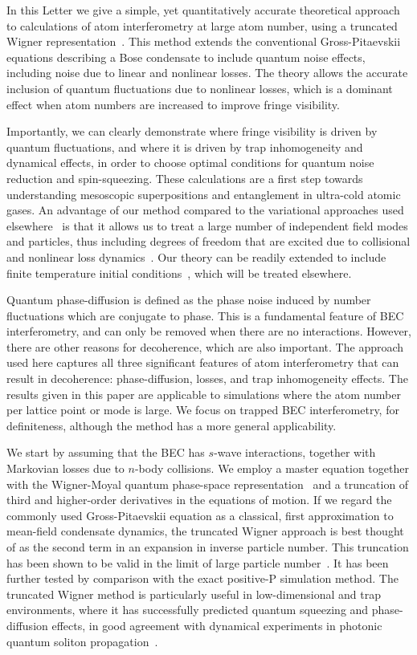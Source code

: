 \documentclass[aps,prl,twocolumn,showpacs,amsmath,amssymb,superscriptaddress,flushbottom,noraggedfooter]{revtex4-1}
\begin{document}
In this Letter we give a simple, yet quantitatively accurate theoretical approach
to calculations of atom interferometry at large atom number,
using a truncated Wigner representation~\cite{Drummond1993,Steel1998,Sinatra2002}.
This method extends the conventional Gross-Pitaevskii equations
describing a Bose condensate to include quantum noise effects,
including noise due to linear and nonlinear losses.
The theory allows the accurate inclusion of quantum fluctuations due to nonlinear losses,
which is a dominant effect when atom numbers are increased to improve fringe visibility.

Importantly, we can clearly demonstrate where fringe visibility is driven by quantum fluctuations,
and where it is driven by trap inhomogeneity and dynamical effects,
in order to choose optimal conditions for quantum noise reduction and spin-squeezing.
These calculations are a first step towards understanding mesoscopic superpositions and entanglement in ultra-cold atomic gases.
An advantage of our method compared to the variational approaches used elsewhere~\cite{Li2009,Sakmann2009}
is that it allows us to treat a large number of independent field modes and particles,
thus including degrees of freedom that are excited due to
collisional and nonlinear loss dynamics~\cite{Norrie2005,Deuar2007}.
Our theory can be readily extended to include finite temperature initial conditions~\cite{Steel1998,Isella2006},
which will be treated elsewhere.

Quantum phase-diffusion is defined as the phase noise induced by number fluctuations
which are conjugate to phase.
This is a fundamental feature of BEC interferometry, and can only be removed when there are no interactions.
However, there are other reasons for decoherence, which are also important.
The approach used here captures all three significant features of atom
interferometry that can result in decoherence: phase-diffusion, losses,
and trap inhomogeneity effects.
The results given in this paper are applicable to simulations where the
atom number per lattice point or mode is large.
We focus on trapped BEC interferometry, for definiteness, although the method has a more general applicability.

We start by assuming that the BEC has $s$-wave interactions,
together with Markovian losses due to $n$-body collisions.
We employ a master equation together with the Wigner-Moyal quantum phase-space representation~\cite{Gardiner2004}
and a truncation of third and higher-order derivatives in the equations of motion.
If we regard the commonly used Gross-Pitaevskii equation as a classical,
first approximation to mean-field condensate dynamics,
the truncated Wigner approach is best thought of as the second term in an expansion in inverse particle number.
This truncation has been shown to be valid in the limit of large particle
number~\cite{Drummond1993,Steel1998,Sinatra2002}.
It has been further tested by comparison with the exact positive-P simulation method.
The truncated Wigner method is particularly useful in low-dimensional and
trap environments, where it has successfully predicted quantum squeezing
and phase-diffusion effects, in good agreement with dynamical experiments
in photonic quantum soliton propagation~\cite{Carter1987,Corney2008}.
\end{document}
